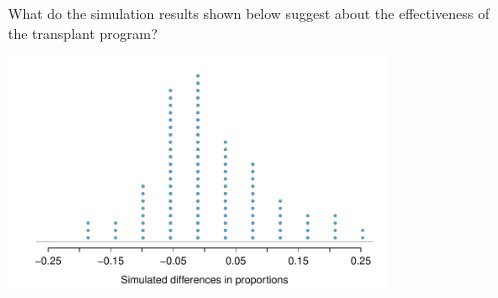{\begin{parts}
\begin{subparts}
\begin{adjustwidth}{2em}{2em}
\end{adjustwidth}
\item What do the simulation results shown below suggest about the effectiveness of the transplant program?
\end{subparts}
\end{parts}
\begin{center}
\includegraphics[width = 0.75\textwidth]{01/figures/eoce/heartTr/heartTr_RandHist} \\
\end{center}
}{}


\textB{\pagebreak}

